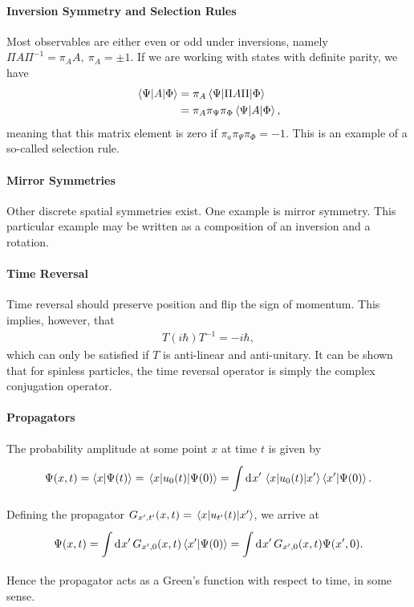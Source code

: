 \paragraph{Inversion Symmetry and Selection Rules}
Most observables are either even or odd under inversions, namely $\Pi A\Pi^{-1} = \pi_{A}A,\ \pi_{A} = \pm 1$. If we are working with states with definite parity, we have
\begin{align*}
	\mel{\Psi}{A}{\Phi} &= \pi_{A}\mel{\Psi}{\Pi A\Pi}{\Phi} \\
	                    &= \pi_{A}\pi_{\Psi}\pi_{\Phi}\mel{\Psi}{A}{\Phi},
\end{align*}
meaning that this matrix element is zero if $\pi_{a}\pi_{\Psi}\pi_{\Phi} = -1$. This is an example of a so-called selection rule.

\paragraph{Mirror Symmetries}
Other discrete spatial symmetries exist. One example is mirror symmetry. This particular example may be written as a composition of an inversion and a rotation.

\paragraph{Time Reversal}


Time reversal should preserve position and flip the sign of momentum. This implies, however, that
\begin{align*}
	T(i\hbar)T^{-1} = -i\hbar,
\end{align*}
which can only be satisfied if $T$ is anti-linear and anti-unitary. It can be shown that for spinless particles, the time reversal operator is simply the complex conjugation operator.

\paragraph{Propagators}
The probability amplitude at some point $x$ at time $t$ is given by
\begin{align*}
	\Psi(x, t) = \braket{x}{\Psi(t)} = \mel{x}{u_{0}(t)}{\Psi(0)} = \int\limits_{}^{}\dd[]{x^{\prime}}\mel{x}{u_{0}(t)}{x^{\prime}}\braket{x^{\prime}}{\Psi(0)}.
\end{align*}
Defining the propagator $G_{x^{\prime}, t^{\prime}}(x, t) = \mel{x}{u_{t^{\prime}}(t)}{x^{\prime}}$, we arrive at
\begin{align*}
	\Psi(x, t) = \int\limits_{}^{}\dd[]{x^{\prime}}G_{x^{\prime}, 0}(x, t)\braket{x^{\prime}}{\Psi(0)} = \int\limits_{}^{}\dd[]{x^{\prime}}G_{x^{\prime}, 0}(x, t)\Psi(x^{\prime}, 0).
\end{align*}
Hence the propagator acts as a Green's function with respect to time, in some sense.

